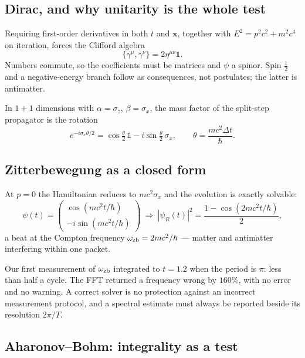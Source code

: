 \documentclass[11pt,a4paper]{article}
\theoremstyle{plain}
\theoremstyle{definition}
\begin{document}
\subsection{Dirac, and why unitarity is the whole test}

Requiring first-order derivatives in both $t$ and $\bm x$, together with
$E^2=p^2c^2+m^2c^4$ on iteration, forces the Clifford algebra
\begin{equation}
\{\gamma^\mu,\gamma^\nu\}=2\eta^{\mu\nu}\mathbb 1 .
\end{equation}
Numbers commute, so the coefficients must be matrices and $\psi$ a spinor. Spin
$\tfrac12$ and a negative-energy branch follow as consequences, not postulates;
the latter is antimatter.

In $1{+}1$ dimensions with $\alpha=\sigma_z$, $\beta=\sigma_x$, the mass factor
of the split-step propagator is the rotation
\begin{equation}
e^{-i\sigma_x\theta/2}=\cos\tfrac{\theta}{2}\,\mathbb 1-i\sin\tfrac{\theta}{2}\,\sigma_x,
\qquad \theta=\frac{mc^2\Delta t}{\hbar}.
\label{eq:massrot}
\end{equation}

\subsection{Zitterbewegung as a closed form}

At $p=0$ the Hamiltonian reduces to $mc^2\sigma_x$ and the evolution is exactly
solvable:
\begin{equation}
\psi(t)=\begin{pmatrix}\cos(mc^2t/\hbar)\\ -i\sin(mc^2t/\hbar)\end{pmatrix}
\ \Longrightarrow\
|\psi_R(t)|^2=\frac{1-\cos(2mc^2t/\hbar)}{2},
\end{equation}
a beat at the Compton frequency $\omega_{\rm zb}=2mc^2/\hbar$ --- matter and
antimatter interfering within one packet.

\begin{pitfall}
Our first measurement of $\omega_{\rm zb}$ integrated to $t=1.2$ when the period
is $\pi$: less than half a cycle. The FFT returned a frequency wrong by
$160\%$, with no error and no warning. A correct solver is no protection against
an incorrect measurement protocol, and a spectral estimate must always be
reported beside its resolution $2\pi/T$.
\end{pitfall}

\subsection{Aharonov--Bohm: integrality as a test}
\end{document}
